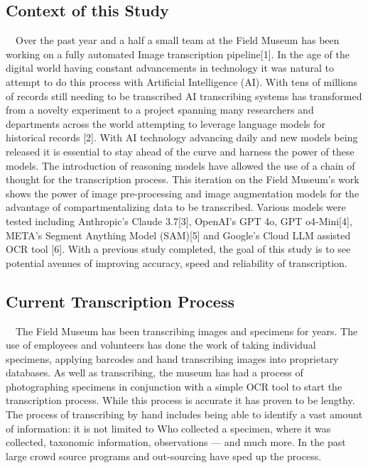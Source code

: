 \documentclass{article}
\begin{document}
\subsection{ Context of this Study}
$\quad$Over the past year and a half a small team at the Field Museum has been working on a fully automated Image transcription pipeline[1]. In the age of the digital world having constant advancements in technology it was natural to attempt to do this process with Artificial Intelligence (AI). With tens of millions of records still needing to be transcribed AI transcribing systems  has transformed from a novelty experiment to a project spanning many researchers and departments across the world attempting to leverage language models for historical records [2]. With AI technology advancing daily and new models being released it is essential to stay ahead of the curve and harness the power of these models. The introduction of reasoning models have allowed the use of a chain of thought for the transcription process. This iteration on the Field Museum’s work shows the power of image pre-processing and image augmentation models for the advantage of compartmentalizing data to be transcribed. Various models were tested including Anthropic's Claude 3.7[3], OpenAI's GPT 4o, GPT o4-Mini[4], META's Segment Anything Model (SAM)[5] and Google's Cloud LLM assisted OCR tool [6]. With a previous study completed, the goal of this study is to see potential avenues of improving accuracy, speed and reliability of transcription. 

\subsection{Current Transcription Process}
$\quad$The Field Museum has been transcribing images and specimens for years. The use of employees and volunteers has done the work of taking individual specimens, applying barcodes and hand transcribing images into proprietary databases. As well as transcribing, the museum has had a process of photographing specimens in conjunction with a simple OCR tool to start the transcription process. While this process is accurate it has proven to be lengthy. The process of transcribing by hand includes being able to identify a vast amount of information: it is not limited to Who collected a specimen, where it was collected, taxonomic information, observations — and much more. In the past large crowd source programs and out-sourcing have sped up the process. 
\end{document}
